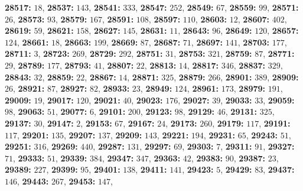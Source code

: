 \textsf{\bfseries 28517:} $18$, \textsf{\bfseries 28537:} $143$, \textsf{\bfseries 28541:} $333$, \textsf{\bfseries 28547:} $252$, \textsf{\bfseries 28549:} $67$, \textsf{\bfseries 28559:} $99$, \textsf{\bfseries 28571:} $26$, \textsf{\bfseries 28573:} $93$, \textsf{\bfseries 28579:} $167$, \textsf{\bfseries 28591:} $108$, \textsf{\bfseries 28597:} $110$, \textsf{\bfseries 28603:} $12$, \textsf{\bfseries 28607:} $402$, \textsf{\bfseries 28619:} $59$, \textsf{\bfseries 28621:} $158$, \textsf{\bfseries 28627:} $145$, \textsf{\bfseries 28631:} $11$, \textsf{\bfseries 28643:} $96$, \textsf{\bfseries 28649:} $120$, \textsf{\bfseries 28657:} $124$, \textsf{\bfseries 28661:} $18$, \textsf{\bfseries 28663:} $199$, \textsf{\bfseries 28669:} $87$, \textsf{\bfseries 28687:} $71$, \textsf{\bfseries 28697:} $141$, \textsf{\bfseries 28703:} $177$, \textsf{\bfseries 28711:} $3$, \textsf{\bfseries 28723:} $269$, \textsf{\bfseries 28729:} $292$, \textsf{\bfseries 28751:} $31$, \textsf{\bfseries 28753:} $321$, \textsf{\bfseries 28759:} $87$, \textsf{\bfseries 28771:} $29$, \textsf{\bfseries 28789:} $177$, \textsf{\bfseries 28793:} $41$, \textsf{\bfseries 28807:} $22$, \textsf{\bfseries 28813:} $14$, \textsf{\bfseries 28817:} $346$, \textsf{\bfseries 28837:} $329$, \textsf{\bfseries 28843:} $32$, \textsf{\bfseries 28859:} $22$, \textsf{\bfseries 28867:} $14$, \textsf{\bfseries 28871:} $325$, \textsf{\bfseries 28879:} $266$, \textsf{\bfseries 28901:} $389$, \textsf{\bfseries 28909:} $26$, \textsf{\bfseries 28921:} $87$, \textsf{\bfseries 28927:} $82$, \textsf{\bfseries 28933:} $23$, \textsf{\bfseries 28949:} $124$, \textsf{\bfseries 28961:} $173$, \textsf{\bfseries 28979:} $191$, \textsf{\bfseries 29009:} $19$, \textsf{\bfseries 29017:} $120$, \textsf{\bfseries 29021:} $40$, \textsf{\bfseries 29023:} $176$, \textsf{\bfseries 29027:} $39$, \textsf{\bfseries 29033:} $33$, \textsf{\bfseries 29059:} $98$, \textsf{\bfseries 29063:} $51$, \textsf{\bfseries 29077:} $6$, \textsf{\bfseries 29101:} $200$, \textsf{\bfseries 29123:} $98$, \textsf{\bfseries 29129:} $46$, \textsf{\bfseries 29131:} $325$, \textsf{\bfseries 29137:} $30$, \textsf{\bfseries 29147:} $2$, \textsf{\bfseries 29153:} $67$, \textsf{\bfseries 29167:} $24$, \textsf{\bfseries 29173:} $260$, \textsf{\bfseries 29179:} $117$, \textsf{\bfseries 29191:} $117$, \textsf{\bfseries 29201:} $135$, \textsf{\bfseries 29207:} $137$, \textsf{\bfseries 29209:} $143$, \textsf{\bfseries 29221:} $194$, \textsf{\bfseries 29231:} $65$, \textsf{\bfseries 29243:} $51$, \textsf{\bfseries 29251:} $316$, \textsf{\bfseries 29269:} $440$, \textsf{\bfseries 29287:} $131$, \textsf{\bfseries 29297:} $69$, \textsf{\bfseries 29303:} $7$, \textsf{\bfseries 29311:} $91$, \textsf{\bfseries 29327:} $71$, \textsf{\bfseries 29333:} $51$, \textsf{\bfseries 29339:} $384$, \textsf{\bfseries 29347:} $347$, \textsf{\bfseries 29363:} $42$, \textsf{\bfseries 29383:} $90$, \textsf{\bfseries 29387:} $23$, \textsf{\bfseries 29389:} $227$, \textsf{\bfseries 29399:} $95$, \textsf{\bfseries 29401:} $138$, \textsf{\bfseries 29411:} $141$, \textsf{\bfseries 29423:} $5$, \textsf{\bfseries 29429:} $83$, \textsf{\bfseries 29437:} $146$, \textsf{\bfseries 29443:} $267$, \textsf{\bfseries 29453:} $147$, 
